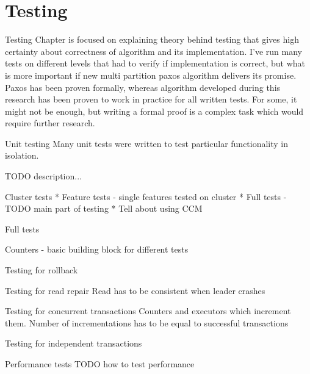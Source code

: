 
\chapter{Testing}\label{chapter:testing}

Testing
 Chapter is focused on explaining theory behind testing that gives high certainty about correctness of algorithm and its implementation.  I’ve run many tests on different levels that had to verify if implementation is correct, but what is more important if new multi partition paxos algorithm delivers its promise. 
Paxos has been proven formally, whereas algorithm developed during this research has been proven to work in practice for all written tests. For some, it might not be enough, but writing a formal proof is a complex task which would require further research.


Unit testing
Many unit tests were written to test particular functionality in isolation. 


TODO description...


Cluster tests
* Feature tests - single features tested on cluster
* Full tests - TODO main part of testing
* Tell about using CCM


Full tests


Counters - basic building block for different tests


Testing for rollback


Testing for read repair
Read has to be consistent when leader crashes


Testing for concurrent transactions
Counters and executors which increment them. Number of incrementations has to be equal to successful transactions


Testing for independent transactions


Performance tests
TODO how to test performance 
